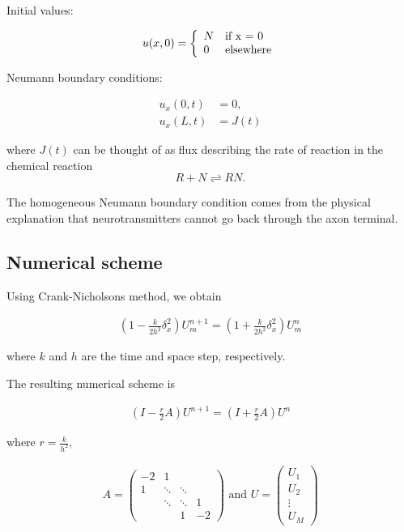 \documentclass{article}
\begin{document}
Initial values:

\[ u(x,0) = \left\{ 
  \begin{array}{l l}
    N & \text{if x = 0}\\
    0 & \text{elsewhere}
  \end{array} \right.\]

Neumann boundary conditions:

\begin{align*}
u_x(0,t) &= 0, \\
u_x(L,t) &= J(t)
\end{align*}

where $J(t)$ can be thought of as flux describing the rate of reaction in the chemical reaction
\begin{equation}
R + N \rightleftharpoons RN.
\end{equation}

The homogeneous Neumann boundary condition comes from the physical explanation that neurotransmitters cannot go back through the axon terminal.

\subsection*{Numerical scheme}

Using Crank-Nicholsons method, we obtain 

\begin{align*}
(1 - \frac{k}{2h^2} \delta^2_x)U^{n+1}_m = (1 + \frac{k}{2h^2} \delta^2_x) U_m^n
\end{align*}

where $k$ and $h$ are the time and space step, respectively. 

The resulting numerical scheme is

\begin{align*}
\left(I - \frac{r}{2} A\right) U^{n+1} = \left(I + \frac{r}{2} A\right) U^n
\end{align*}

where $r = \frac{k}{h^2}$,


\begin{align*}
A = 
\begin{pmatrix}
  -2 & 1 &  &  \\
  1 & \ddots & \ddots &  \\
    & \ddots  & \ddots & 1 \\
   &  & 1 & -2
\end{pmatrix} 
\textrm{ and }
U = \begin{pmatrix}
U_1 \\
U_2 \\
\vdots \\
U_{M} 
\end{pmatrix}
\end{align*}
\end{document}
